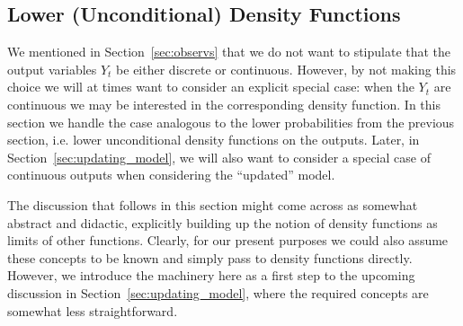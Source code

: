 \documentclass[3p]{elsarticle}
\newcommand{\states}{\mathcal{X}}
\newcommand{\observs}{\mathcal{Y}}
\newcommand{\rateset}{\mathcal{Q}}
\begin{document}

\subsection{Lower (Unconditional) Density Functions}\label{subsec:low_marg_density}

We mentioned in Section~\ref{sec:observs} that we do not want to stipulate that the output variables $Y_t$ be either discrete or continuous. However, by not making this choice we will at times want to consider an explicit special case: when the $Y_t$ are continuous we may be interested in the corresponding density function. In this section we handle the case analogous to the lower probabilities from the previous section, i.e. lower unconditional density functions on the outputs. Later, in Section~\ref{sec:updating_model}, we will also want to consider a special case of continuous outputs when considering the ``updated'' model.  

The discussion that follows in this section might come across as somewhat abstract and didactic, explicitly building up the notion of density functions as limits of other functions. Clearly, for our present purposes we could also assume these concepts to be known and simply pass to density functions directly. However, we introduce the machinery here as a first step to the upcoming discussion in Section~\ref{sec:updating_model}, where the required concepts are somewhat less straightforward.
\end{document}
